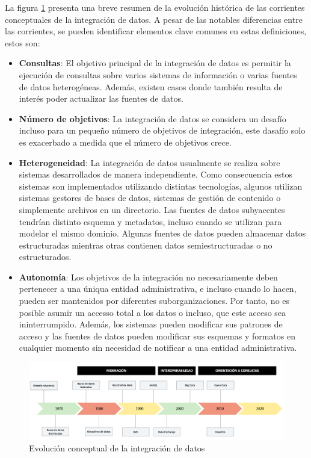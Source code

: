 La figura \ref{fig:data-integration-timeline} presenta una breve resumen de la evolución histórica de las corrientes
conceptuales de la integración de datos. A pesar de las notables diferencias entre las corrientes, se pueden identificar elementos clave comunes en estas definiciones, estos son:

\begin{itemize}
    \item \textbf{Consultas}: El objetivo principal de la integración de datos es permitir la ejecución de consultas sobre varios
    sistemas de información o varias fuentes de datos heterogéneas. Además, existen casos donde también resulta de interés poder actualizar las fuentes de datos.

    \item \textbf{N\'umero de objetivos}: La integración de datos se considera un desafío incluso para un pequeño número de objetivos de integración,
     este dasafío solo es exacerbado a medida que el número de objetivos crece. 

    \item \textbf{Heterogeneidad}: La integración de datos usualmente se realiza sobre sistemas desarrollados de manera
    independiente. Como consecuencia estos sistemas son implementados utilizando distintas tecnologías, algunos utilizan sistemas gestores
    de bases de datos, sistemas de gestión de contenido o simplemente archivos en un directorio. Las fuentes de datos subyacentes tendrían distinto
    esquema y metadatos, incluso cuando se utilizan para modelar el mismo dominio. Algunas fuentes de datos pueden almacenar datos estructuradas mientras otras contienen datos semiestructuradas o no estructurados.

    \item \textbf{Autonom\'ia}: Los objetivos de la integración no necesariamente deben pertenecer a una úniqua entidad administrativa,
    e incluso cuando lo hacen, pueden ser mantenidos por diferentes suborganizaciones. Por tanto, no es posible asumir un accesso total
    a los datos o incluso, que este acceso sea ininterrumpido. Además, los sistemas pueden modificar sus patrones de acceso y las fuentes de datos pueden modificar sus esquemas y
    formatos en cualquier momento sin necesidad de notificar a una entidad administrativa.
\end{itemize}

\begin{figure}[h!]
    \centering
    \includegraphics[width=\textwidth]{Images/data-integration-timeline.png}
    \caption{Evolución conceptual de la integración de datos}
    \label{fig:data-integration-timeline}
\end{figure}

